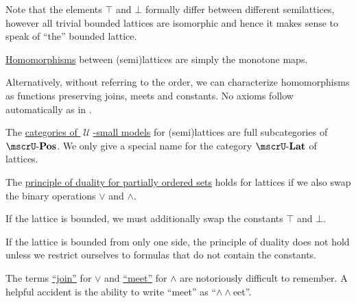 \begin{definition}
\begin{thmenum}[resume=def:semilattice]
    Note that the elements \( \top \) and \( \bot \) formally differ between different semilattices, however all trivial bounded lattices are isomorphic and hence it makes sense to speak of \enquote{the} bounded lattice.

     \hyperref[def:first_order_homomorphism]{Homomorphisms} between (semi)lattices are simply the monotone maps.

    Alternatively, without referring to the order, we can characterize homomorphisms as functions preserving joins, meets and constants. No axioms follow automatically as in .

     The \hyperref[def:category_of_small_first_order_models]{categories of \( \mscrU \)-small models} for (semi)lattices are full subcategories of \hyperref[def:partially_ordered_set/category]{\( \ucat{Pos} \)}. We only give a special name for the category \( \ucat{Lat} \) of lattices.

     The \hyperref[def:partially_ordered_set/duality]{principle of duality for partially ordered sets} holds for lattices if we also swap the binary operations \( \vee \) and \( \wedge \).

    If the lattice is bounded, we must additionally swap the constants \( \top \) and \( \bot \).

    If the lattice is bounded from only one side, the principle of duality does not hold unless we restrict ourselves to formulas that do not contain the constants.
  \end{thmenum}
\end{definition}

\begin{remark}\label{rem:lattice_operation_etymology}
  The terms \hyperref[def:semilattice/join]{\enquote{join}} for \( \vee \) and \hyperref[def:semilattice/meet]{\enquote{meet}} for \( \wedge \) are notoriously difficult to remember. A helpful accident is the ability to write \enquote{meet} as \enquote{\( \wedge \wedge \)eet}.
\end{remark}

